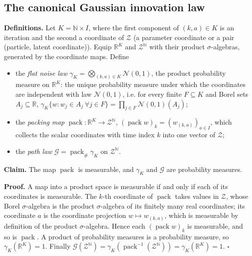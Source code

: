 \documentclass[11pt,a4paper]{report}
\begin{document}
\subsection{\texorpdfstring{The canonical Gaussian innovation law}{The canonical Gaussian innovation law}}
\label{report-step-IPLA-AlgorithmLaw-lean-1}


\textbf{Definitions.} Let \(K=\mathbb N\times I\), where the first component of \((k,a)\in K\) is an iteration and the second a coordinate of \(\mathcal Z\) (a parameter coordinate or a pair (particle, latent coordinate)). Equip \(\mathbb R^K\) and \(\mathcal Z^{\mathbb N}\) with their product \(\sigma\)-algebras, generated by the coordinate maps. Define



\begin{itemize}


\item the \emph{flat noise law} \(\gamma_K=\bigotimes_{(k,a)\in K}\mathcal N(0,1)\), the product probability measure on \(\mathbb R^K\): the unique probability measure under which the coordinates are independent with law \(\mathcal N(0,1)\), i.e. for every finite \(F\subseteq K\) and Borel sets \(A_j\subseteq\mathbb R\), \(\gamma_K\{w:w_j\in A_j\ \forall j\in F\}=\prod_{j\in F}\mathcal N(0,1)(A_j)\);

\item the \emph{packing map} \(\operatorname{pack}:\mathbb R^K\to\mathcal Z^{\mathbb N}\), \((\operatorname{pack}w)_k=(w_{(k,a)})_{a\in I}\), which collects the scalar coordinates with time index \(k\) into one vector of \(\mathcal Z\);

\item the \emph{path law} \(\mathcal G=\operatorname{pack}_\#\gamma_K\) on \(\mathcal Z^{\mathbb N}\).

\end{itemize}



\textbf{Claim.} The map \(\operatorname{pack}\) is measurable, and \(\gamma_K\) and \(\mathcal G\) are probability measures.




\textbf{Proof.} A map into a product space is measurable if and only if each of its coordinates is measurable. The \(k\)-th coordinate of \(\operatorname{pack}\) takes values in \(\mathcal Z\), whose Borel \(\sigma\)-algebra is the product \(\sigma\)-algebra of its finitely many real coordinates; its coordinate \(a\) is the coordinate projection \(w\mapsto w_{(k,a)}\), which is measurable by definition of the product \(\sigma\)-algebra. Hence each \((\operatorname{pack}w)_k\) is measurable, and so is \(\operatorname{pack}\). A product of probability measures is a probability measure, so \(\gamma_K(\mathbb R^K)=1\). Finally \(\mathcal G(\mathcal Z^{\mathbb N})=\gamma_K(\operatorname{pack}^{-1}(\mathcal Z^{\mathbb N}))=\gamma_K(\mathbb R^K)=1\). \(\square\)
\end{document}
